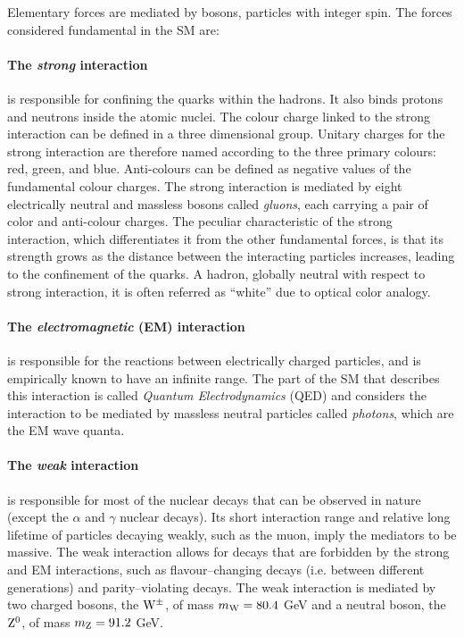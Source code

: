 Elementary forces are mediated by bosons, particles with integer spin. The forces considered fundamental in the SM are:

\paragraph{The \emph{strong} interaction} is responsible for confining the quarks within the hadrons. It also binds protons and neutrons inside the atomic nuclei. The colour charge linked to the strong interaction can be defined in a three dimensional group. Unitary charges for the strong interaction are therefore named according to the three primary colours: red, green, and blue. Anti-colours can be defined as negative values of the fundamental colour charges. The strong interaction is mediated by eight electrically neutral and massless bosons called \emph{gluons}, each carrying a pair of color and anti-colour charges. The peculiar characteristic of the strong interaction, which differentiates it from the other fundamental forces, is that its strength grows as  the distance between the interacting particles increases, leading to the confinement of the quarks. A hadron, globally neutral with respect to strong interaction, it is often referred as ``white'' due to optical color analogy.

\paragraph{The \emph{electromagnetic} (EM) interaction} is responsible for the reactions between electrically charged particles, and is empirically known to have an infinite range. The part of the SM that describes this interaction is called \emph{Quantum Electrodynamics} (QED) and considers the interaction to be mediated by massless neutral particles called \emph{photons}, which are the EM wave quanta.

\paragraph{The \emph{weak} interaction} is responsible for most of the nuclear decays that can be observed in nature (except the $\alpha$ and $\gamma$ nuclear decays). Its short interaction range and relative long lifetime of particles decaying weakly, such as the muon, imply the mediators to be massive. The weak interaction allows for decays that are forbidden by the strong and EM interactions, such as flavour--changing decays (i.e. between different generations) and parity--violating decays. The weak interaction is mediated by two charged bosons, the $\mathrm{W}^\pm$, of mass $m_{\mathrm{W}} = 80.4$ GeV and a neutral boson, the $\mathrm{Z}^{0}$, of mass $m_{\mathrm{Z}} = 91.2$ GeV.

